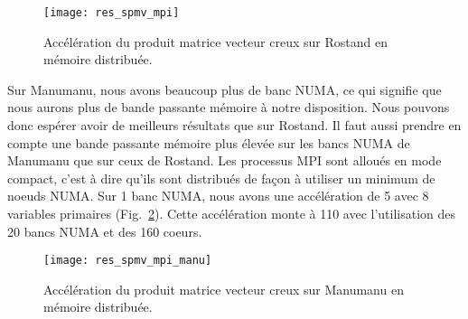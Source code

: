 \begin{figure}
  \centering
  \texttt{[image: res\_spmv\_mpi]}
  \caption{Accélération du produit matrice vecteur creux sur Rostand en mémoire distribuée.}
  \label{fig:res_spmv_mpi_rostand}
\end{figure}



Sur Manumanu, nous avons beaucoup plus de banc NUMA, ce qui signifie que nous aurons plus de bande passante mémoire à notre disposition.
%
Nous pouvons donc espérer avoir de meilleurs résultats que sur Rostand.
%
Il faut aussi prendre en compte une bande passante mémoire plus élevée sur les bancs NUMA de Manumanu que sur ceux de Rostand.
%
Les processus MPI sont alloués en mode compact, c'est à dire qu'ils sont distribués de façon à utiliser un minimum de noeuds NUMA.
%
Sur 1 banc NUMA, nous avons une accélération de 5 avec 8 variables primaires (Fig.~\ref{fig:res_spmv_mpi_manumanu}).
%
Cette accélération monte à 110 avec l'utilisation des 20 bancs NUMA et des 160 coeurs.


\begin{figure}
  \centering
  \texttt{[image: res\_spmv\_mpi\_manu]}
  \caption{Accélération du produit matrice vecteur creux sur Manumanu en mémoire distribuée.}
  \label{fig:res_spmv_mpi_manumanu}
\end{figure}
